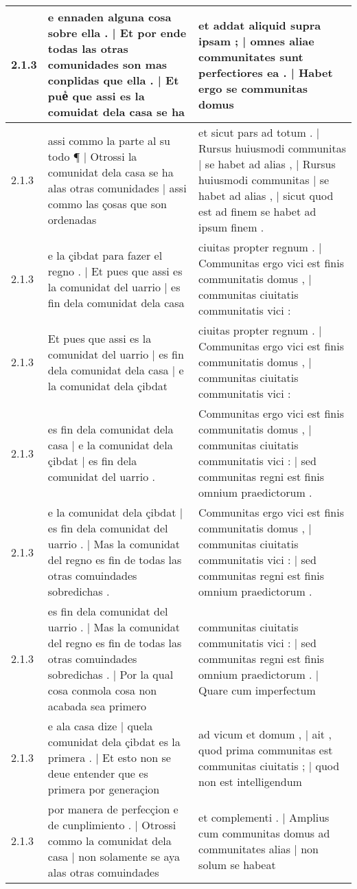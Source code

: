 \begin{tabular}{|p{1cm}|p{6.5cm}|p{6.5cm}|}
2.1.3 & e ennaden alguna cosa sobre ella . | Et por ende todas las otras comunidades son mas conplidas que ella . | Et pueᷤ que assi es la comuidat dela casa se ha & et addat aliquid supra ipsam ; | omnes aliae communitates sunt perfectiores ea . | Habet ergo se communitas domus \\\hline
2.1.3 & assi commo la parte al su todo ¶ | Otrossi la comunidat dela casa se ha alas otras comunidades | assi commo las çosas que son ordenadas & et sicut pars ad totum . | Rursus huiusmodi communitas | se habet ad alias , | Rursus huiusmodi communitas | se habet ad alias , | sicut quod est ad finem se habet ad ipsum finem . \\\hline
2.1.3 & e la çibdat para fazer el regno . | Et pues que assi es la comunidat del uarrio | es fin dela comunidat dela casa & ciuitas propter regnum . | Communitas ergo vici est finis communitatis domus , | communitas ciuitatis communitatis vici : \\\hline
2.1.3 & Et pues que assi es la comunidat del uarrio | es fin dela comunidat dela casa | e la comunidat dela çibdat & ciuitas propter regnum . | Communitas ergo vici est finis communitatis domus , | communitas ciuitatis communitatis vici : \\\hline
2.1.3 & es fin dela comunidat dela casa | e la comunidat dela çibdat | es fin dela comunidat del uarrio . & Communitas ergo vici est finis communitatis domus , | communitas ciuitatis communitatis vici : | sed communitas regni est finis omnium praedictorum . \\\hline
2.1.3 & e la comunidat dela çibdat | es fin dela comunidat del uarrio . | Mas la comunidat del regno es fin de todas las otras comuindades sobredichas . & Communitas ergo vici est finis communitatis domus , | communitas ciuitatis communitatis vici : | sed communitas regni est finis omnium praedictorum . \\\hline
2.1.3 & es fin dela comunidat del uarrio . | Mas la comunidat del regno es fin de todas las otras comuindades sobredichas . | Por la qual cosa conmola cosa non acabada sea primero & communitas ciuitatis communitatis vici : | sed communitas regni est finis omnium praedictorum . | Quare cum imperfectum \\\hline
2.1.3 & e ala casa dize | quela comunidat dela çibdat es la primera . | Et esto non se deue entender que es primera por generaçion & ad vicum et domum , | ait , quod prima communitas est communitas ciuitatis ; | quod non est intelligendum \\\hline
2.1.3 & por manera de perfecçion e de cunplimiento . | Otrossi commo la comunidat dela casa | non solamente se aya alas otras comuindades & et complementi . | Amplius cum communitas domus ad communitates alias | non solum se habeat \\\hline

\end{tabular}
